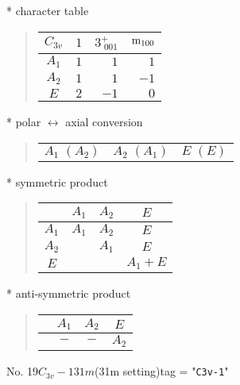 \documentclass[fleqn,10pt,landscape]{jsarticle}
\begin{document}
* character table
\begin{quote}
\begin{tabular}{crrr} \hline \hline
$ C_{3v} $ & $ 1 $ & $ 3^{+}_{\,\,001} $ & $ {\rm m}_{100} $ \\ \hline
$ A_{1} $ & $ 1 $ & $ 1 $ & $ 1 $ \\
$ A_{2} $ & $ 1 $ & $ 1 $ & $ -1 $ \\
$ E $ & $ 2 $ & $ -1 $ & $ 0 $ \\
 \hline \hline
\end{tabular}
\end{quote}
* polar $\leftrightarrow$ axial conversion
\begin{quote}
\begin{tabular}{ccc}
$ A_{1}\,\,(A_{2}) $ & $ A_{2}\,\,(A_{1}) $ & $ E\,\,(E) $
\end{tabular}
\end{quote}
* symmetric product
\begin{quote}
\begin{tabular}{c|ccc} \hline \hline
 & $ A_{1} $ & $ A_{2} $ & $ E $ \\ \hline
$ A_{1} $ & $ A_{1} $ & $ A_{2} $ & $ E $ \\
$ A_{2} $ & $  $ & $ A_{1} $ & $ E $ \\
$ E $ & $  $ & $  $ & $ A_{1} + E $ \\
 \hline \hline
\end{tabular}
\end{quote}
* anti-symmetric product
\begin{quote}
\begin{tabular}{cccc} \hline \hline
 & $ A_{1} $ & $ A_{2} $ & $ E $ \\ \hline
$  $ & $ - $ & $ - $ & $ A_{2} $ \\
 \hline \hline
\end{tabular}
\end{quote}
\newpage
No. 19\quad$C_{3v}-1$\quad$31m$\quad(31m setting)\quad[ trigonal ]
tag = "{\tt C3v-1}"
\end{document}
